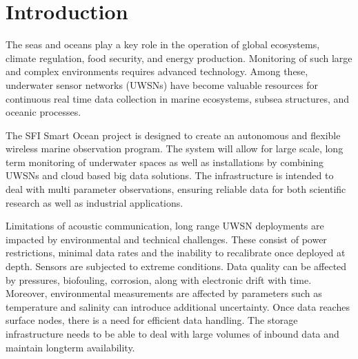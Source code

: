 




\chapter{Introduction}\label{chap:introduction}

The seas and oceans play a key role in the operation of global ecosystems,
climate regulation, food security, and energy
production\cite{CopernicusFoodSecurity}. Monitoring of such large and complex
environments requires advanced technology. Among these, underwater sensor
networks (UWSNs) have become valuable resources for continuous real time data
collection in marine ecosystems, subsea structures, and oceanic
processes\cite{Domingos2024}.

The SFI Smart Ocean project is designed to create an autonomous and flexible
wireless marine observation program. The system will allow for large scale,
long term monitoring of underwater spaces as well as installations by combining
UWSNs and cloud based big data solutions. The infrastructure is intended to
deal with multi parameter observations, ensuring reliable data for both
scientific research as well as industrial
applications\cite{SmartOceanProject,SmartOceanSite}.

Limitations of acoustic communication, long range UWSN deployments are impacted
by environmental and technical challenges. These consist of power restrictions,
minimal data rates and the inability to recalibrate once deployed at depth.
Sensors are subjected to extreme conditions. Data quality can be affected by
pressures, biofouling, corrosion, along with electronic drift with time.
Moreover, environmental measurements are affected by parameters such as
temperature and salinity can introduce additional
uncertainty\cite{Skalvik2023}. Once data reaches surface nodes, there is a need
for efficient data handling. The storage infrastructure needs to be able to
deal with large volumes of inbound data and maintain longterm availability.

